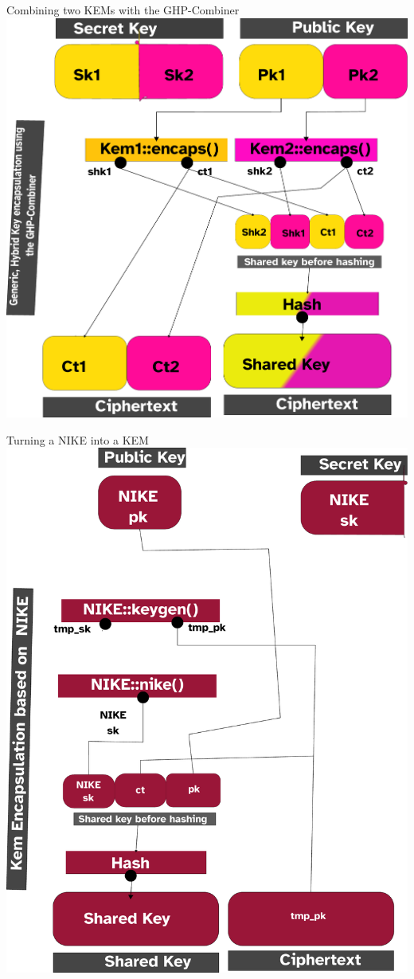 \begin{frame}{Combining two KEMs with the GHP-Combiner}
  \hypertarget{ghp-combiner}{}
  \centering
  \includegraphics[height=.85\textheight]{graphics/ghp-combiner.pdf}
\end{frame}

\begin{frame}{Turning a NIKE into a KEM}
  \hypertarget{dhkem}{}
  \centering
    \includegraphics[height=.85\textheight]{graphics/dhkem.pdf}
\end{frame}

